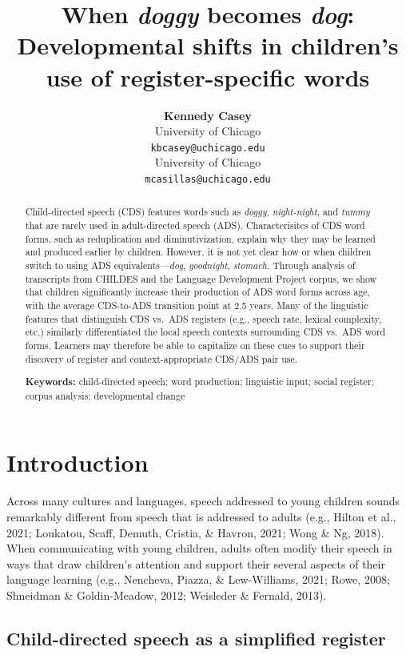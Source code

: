 \documentclass[10pt, letterpaper]{article}
\title{When \emph{doggy} becomes \emph{dog}: Developmental shifts in
children's use of register-specific words}
\author{{\large \bf Kennedy Casey} \\ University of Chicago \\ \texttt{kbcasey@uchicago.edu} \And {\large \bf Marisa Casillas} \\ University of Chicago \\ \texttt{mcasillas@uchicago.edu}}
\begin{document}
\maketitle

\begin{abstract}
Child-directed speech (CDS) features words such as \emph{doggy},
\emph{night-night}, and \emph{tummy} that are rarely used in
adult-directed speech (ADS). Characterisitcs of CDS word forms, such as
reduplication and diminutivization, explain why they may be learned and
produced earlier by children. However, it is not yet clear how or when
children switch to using ADS equivalents---\emph{dog}, \emph{goodnight},
\emph{stomach}. Through analysis of transcripts from CHILDES and the
Language Development Project corpus, we show that children significantly
increase their production of ADS word forms across age, with the average
CDS-to-ADS transition point at 2.5 years. Many of the linguistic
features that distinguish CDS vs.~ADS registers (e.g., speech rate,
lexical complexity, etc.) similarly differentiated the local speech
contexts surrounding CDS vs.~ADS word forms. Learners may therefore be
able to capitalize on these cues to support their discovery of register
and context-appropriate CDS/ADS pair use.

\textbf{Keywords:}
child-directed speech; word production; linguistic input; social
register; corpus analysis; developmental change
\end{abstract}

\hypertarget{introduction}{%
\section{Introduction}\label{introduction}}

Across many cultures and languages, speech addressed to young children
sounds remarkably different from speech that is addressed to adults
(e.g., Hilton et al., 2021; Loukatou, Scaff, Demuth, Cristia, \& Havron,
2021; Wong \& Ng, 2018). When communicating with young children, adults
often modify their speech in ways that draw children's attention and
support their several aspects of their language learning (e.g.,
Nencheva, Piazza, \& Lew-Williams, 2021; Rowe, 2008; Shneidman \&
Goldin-Meadow, 2012; Weisleder \& Fernald, 2013).

\hypertarget{child-directed-speech-as-a-simplified-register}{%
\subsection{Child-directed speech as a simplified
register}\label{child-directed-speech-as-a-simplified-register}}
\end{document}
